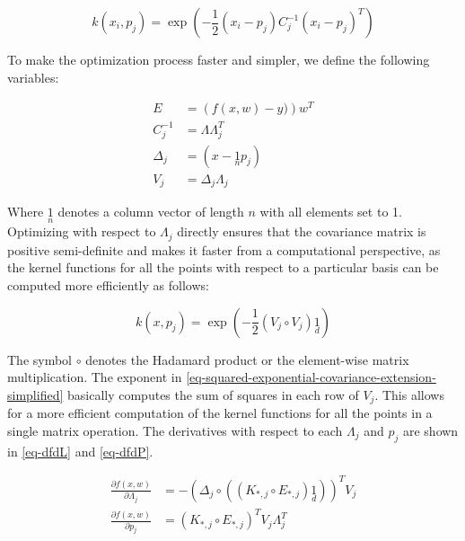 \documentclass[useAMS,usenatbib,fleqn]{mn2e}
\begin{document}
\begin{equation}
\label{eq-squared-exponential-covariance-extension}
k(x_{i},p_{j}) = \exp{\left(-\frac{1}{2}\left(x_{i}-p_{j}\right)C_{j}^{-1}\left(x_{i}-p_{j}\right)^{T}\right)}
\end{equation}

To make the optimization process faster and simpler, we define the following variables:

\begin{subequations}
\begin{align} 
\label{eq-error}
E &= \left(f(x,w)-y)\right)w^{T}\\
\label{eq-Cinv}
C_{j}^{-1} &= \Lambda\Lambda_{j}^{T}\\
\label{eq-Delta_j}
\Delta_{j} &= \left(x-\underset{n}{1}p_{j}\right)\\
\label{eq-V_j}
V_{j} &= \Delta_{j}\Lambda_{j}
\end{align}
\end{subequations}

Where $\underset{n}{1}$ denotes a column vector of length $n$ with all elements set to 1. Optimizing with respect to $\Lambda_{j}$ directly ensures that the covariance matrix is positive semi-definite and makes it faster from a computational perspective, as the kernel functions for all the points with respect to a particular basis can be computed more efficiently as follows:

\begin{equation}
\label{eq-squared-exponential-covariance-extension-simplified}
k(x,p_{j}) = \exp{\left(-\frac{1}{2}\left(V_{j}\circ V_{j}\right)\underset{d}{1}\right)}
\end{equation}

The symbol $\circ$ denotes the Hadamard product or the element-wise matrix multiplication. The exponent in \eqref{eq-squared-exponential-covariance-extension-simplified} basically computes the sum of squares in each row of $V_{j}$. This allows for a more efficient computation of the kernel functions for all the points in a single matrix operation. The derivatives with respect to each $\Lambda_{j}$ and $p_{j}$ are shown in \eqref{eq-dfdL} and \eqref{eq-dfdP}.

\begin{subequations}
\begin{align} 
\label{eq-dfdL}
\frac{\partial f(x,w)}{\partial \Lambda_{j}} &= -\left( \Delta_{j}\circ \left(\left(K_{*,j}\circ E_{*,j}\right)\underset{d}{1}\right) \right)^{T}V_{j}\\
\label{eq-dfdP}
\frac{\partial f(x,w)}{\partial p_{j}} &= \left( K_{*,j}\circ E_{*,j} \right)^{T}V_{j}\Lambda_{j}^{T}
\end{align}
\end{subequations}
\end{document}
